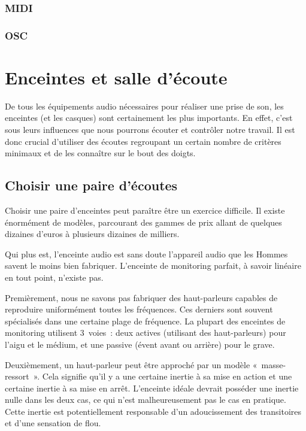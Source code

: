 \documentclass[
]{book}
\begin{document}
\hypertarget{midi}{%
\subsection{MIDI}\label{midi}}

\hypertarget{osc}{%
\subsection{OSC}\label{osc}}

\hypertarget{enceintes-et-salle-duxe9coute}{%
\chapter{Enceintes et salle d'écoute}\label{enceintes-et-salle-duxe9coute}}

De tous les équipements audio nécessaires pour réaliser une prise de son, les enceintes (et les casques) sont certainement les plus importants. En effet, c'est sous leurs influences que nous pourrons écouter et contrôler notre travail. Il est donc crucial d'utiliser des écoutes regroupant un certain nombre de critères minimaux et de les connaître sur le bout des doigts.

\hypertarget{choisir-une-paire-duxe9coutes}{%
\section{Choisir une paire d'écoutes}\label{choisir-une-paire-duxe9coutes}}

Choisir une paire d'enceintes peut paraître être un exercice difficile. Il existe énormément de modèles, parcourant des gammes de prix allant de quelques dizaines d'euros à plusieurs dizaines de milliers.

Qui plus est, l'enceinte audio est sans doute l'appareil audio que les Hommes savent le moins bien fabriquer. L'enceinte de monitoring parfait, à savoir linéaire en tout point, n'existe pas.

Premièrement, nous ne savons pas fabriquer des haut-parleurs capables de reproduire uniformément toutes les fréquences. Ces derniers sont souvent spécialisés dans une certaine plage de fréquence. La plupart des enceintes de monitoring utilisent 3~voies~: deux actives (utilisant des haut-parleurs) pour l'aigu et le médium, et une passive (évent avant ou arrière) pour le grave.

Deuxièmement, un haut-parleur peut être approché par un modèle «~masse-ressort~». Cela signifie qu'il y a une certaine inertie à sa mise en action et une certaine inertie à sa mise en arrêt. L'enceinte idéale devrait posséder une inertie nulle dans les deux cas, ce qui n'est malheureusement pas le cas en pratique. Cette inertie est potentiellement responsable d'un adoucissement des transitoires et d'une sensation de flou.
\end{document}
